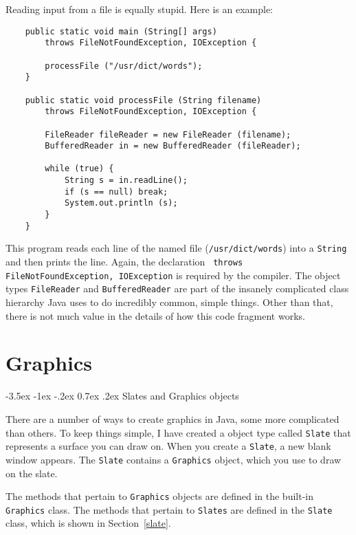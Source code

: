 \documentclass{book}
\makeatletter
\newcounter{exercisenum}
\renewcommand{\section}{\@startsection 
    {section} {1} {0mm}%
    {-3.5ex \@plus -1ex \@minus -.2ex}%
    {0.7ex \@plus.2ex}%
    {\normalfont\Large\bfseries}}
\newcommand{\clearemptydoublepage}{\newpage{\pagestyle{empty}\cleardoublepage}}
\newcommand{\beforechapter}{
    \cleardoublepage 
    \setcounter{exercisenum}{0}
}
\makeatother
\begin{document}
Reading input from a file is equally stupid.  Here is an
example:

\begin{verbatim}
    public static void main (String[] args)
        throws FileNotFoundException, IOException {
	
        processFile ("/usr/dict/words");
    }

    public static void processFile (String filename)
        throws FileNotFoundException, IOException {

        FileReader fileReader = new FileReader (filename);
        BufferedReader in = new BufferedReader (fileReader);

        while (true) {
            String s = in.readLine();
            if (s == null) break;
            System.out.println (s);
        }
    }
\end{verbatim}

This program reads each line of the named file ({\tt /usr/dict/words})
into a {\tt String} and then prints the line.  Again, the declaration {\tt
throws FileNotFoundException, IOException} is required by the
compiler.  The object types {\tt FileReader} and {\tt BufferedReader}
are part of the insanely complicated class hierarchy Java uses to do
incredibly common, simple things.  Other than that, there is not
much value in the details of how this code fragment works.


\beforechapter
\chapter{Graphics}

\section{Slates and Graphics objects}
\label{graphics}

There are a number of ways to create graphics in Java, some more
complicated than others.  To keep things simple, I have created
a object type called {\tt Slate} that represents a surface you can
draw on.  When you create a {\tt Slate}, a new blank window appears.
The {\tt Slate} contains a {\tt Graphics} object, which you use
to draw on the slate.

The methods that pertain to {\tt Graphics} objects are defined
in the built-in {\tt Graphics} class.  The methods that pertain
to {\tt Slates} are defined in the {\tt Slate} class, which is
shown in Section~\ref{slate}.
\end{document}

